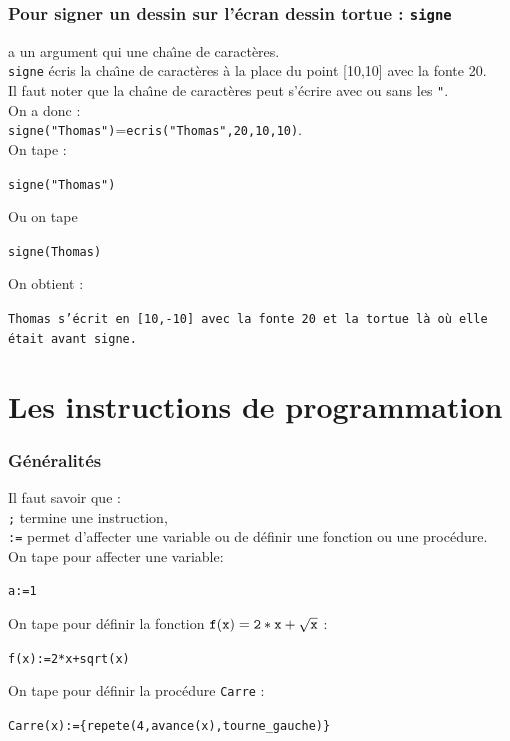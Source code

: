 \documentclass[a4paper,11pt]{book}
\begin{document}
\subsection{Pour signer un dessin sur l'\'ecran dessin tortue : {\tt signe}}
 a un argument qui une cha\^{\i}ne de caract\`eres.\\
{\tt signe} \'ecris la cha\^{\i}ne de caract\`eres \`a la place du point 
[10,10] avec la fonte 20.\\
Il faut noter que la cha\^{\i}ne de caract\`eres peut s'\'ecrire avec ou sans 
les {\tt "}.\\
On a donc :\\
{\tt signe("Thomas")}={\tt ecris("Thomas",20,10,10)}.\\ 
On tape :\\
\begin{center}{\tt signe("Thomas")}\end{center}
Ou on tape
\begin{center}{\tt signe(Thomas)}\end{center}
On obtient :
\begin{center}{\tt Thomas s'\'ecrit en [10,-10] avec la fonte 20 et la tortue l\`a o\`u elle \'etait avant {\tt signe}.}\end{center}

\chapter{Les instructions de programmation}
\subsection{G\'en\'eralit\'es}\index{;}\index{==}\index{:=}\index{<=}\index{>=}\index{>}\index{<}\index{!=}
Il faut savoir que :\\
{\tt ;} termine une instruction,\\
{\tt :=} permet d'affecter une variable ou de d\'efinir une fonction ou une 
proc\'edure.\\
On tape pour affecter une variable:
\begin{center}{\tt a:=1}\end{center}
On tape pour d\'efinir la fonction ${\tt f(x)=2*x+\sqrt x}$ :
\begin{center}{\tt f(x):=2*x+sqrt(x)}\end{center}
On tape pour d\'efinir la proc\'edure {\tt Carre} :
\begin{center}{\tt Carre(x):=\{repete(4,avance(x),tourne\_gauche)\}}\end{center}
\end{document}
